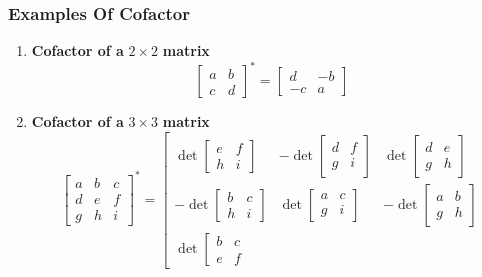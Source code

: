 \documentclass[titlepage,a4paper]{article}
\begin{document}
		\subsubsection{Examples Of Cofactor}
		\begin{enumerate}
			\item \textbf{Cofactor of a} $2\times2$ \textbf{matrix}
				\begin{equation}
					\left[
						\begin{matrix}
							a & b \\
							c & d
						\end{matrix}
					\right]^*
					=
					\left[
						\begin{matrix}
							d & -b \\
							-c & a
						\end{matrix}
					\right]
				\end{equation}
			\item \textbf{Cofactor of a} $3\times3$ \textbf{matrix}
				\begin{equation}
					\left[
						\begin{matrix}
							a & b & c \\
							d & e & f \\
							g & h & i
						\end{matrix}
					\right]^*
					=
					\left[
						\begin{matrix}
							\det
							\left[
								\begin{matrix}
									e & f \\
									h & i
								\end{matrix}
							\right]
							&
							-\det
							\left[
								\begin{matrix}
									d & f \\
									g & i
								\end{matrix}
							\right]
							&
							\det
							\left[
								\begin{matrix}
									d & e \\
									g & h
								\end{matrix}
							\right]
							\\
							-\det
							\left[
								\begin{matrix}
									b & c \\
									h & i
								\end{matrix}
							\right]
							&
							\det
							\left[
								\begin{matrix}
									a & c \\
									g & i
								\end{matrix}
							\right]
							&
							-\det
							\left[
								\begin{matrix}
									a & b \\
									g & h
								\end{matrix}
							\right]
							\\
							\det
							\left[
								\begin{matrix}
									b & c \\
									e & f
	

\end{matrix}
\end{matrix}
\end{equation}
\end{enumerate}
\end{document}
